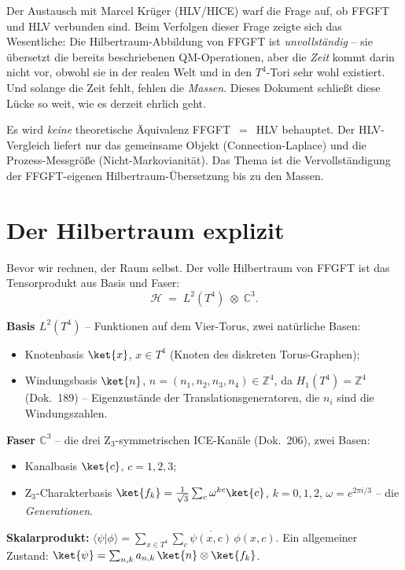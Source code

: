 Der Austausch mit Marcel Krüger (HLV/HICE) warf die Frage auf, ob FFGFT und HLV
verbunden sind. Beim Verfolgen dieser Frage zeigte sich das Wesentliche: Die
Hilbertraum-Abbildung von FFGFT ist \emph{unvollständig} -- sie übersetzt die
bereits beschriebenen QM-Operationen, aber die \emph{Zeit} kommt darin nicht
vor, obwohl sie in der realen Welt und in den $T^4$-Tori sehr wohl existiert.
Und solange die Zeit fehlt, fehlen die \emph{Massen}. Dieses Dokument schließt
diese Lücke so weit, wie es derzeit ehrlich geht.

\begin{important}[Geltungsregel]
Es wird \emph{keine} theoretische Äquivalenz FFGFT~$=$~HLV behauptet. Der
HLV-Vergleich liefert nur das gemeinsame Objekt (Connection-Laplace) und die
Prozess-Messgröße (Nicht-Markovianität). Das Thema ist die Vervollständigung
der FFGFT-eigenen Hilbertraum-Übersetzung bis zu den Massen.
\end{important}

\section{Der Hilbertraum explizit}

Bevor wir rechnen, der Raum selbst. Der volle Hilbertraum von FFGFT ist das
Tensorprodukt aus Basis und Faser:
\begin{equation}
  \mathcal{H}\;=\;L^2(T^4)\;\otimes\;\mathbb{C}^3 .
\end{equation}

\begin{notationBox}
\textbf{Basis $L^2(T^4)$} -- Funktionen auf dem Vier-Torus, zwei natürliche
Basen:
\begin{itemize}
  \item Knotenbasis $\ket{x}$, $x\in T^4$ (Knoten des diskreten Torus-Graphen);
  \item Windungsbasis $\ket{n}$, $n=(n_1,n_2,n_3,n_4)\in\mathbb{Z}^4$, da
        $H_1(T^4)=\mathbb{Z}^4$ (Dok.~189) -- Eigenzustände der
        Translationsgeneratoren, die $n_i$ sind die Windungszahlen.
\end{itemize}
\textbf{Faser $\mathbb{C}^3$} -- die drei Z$_3$-symmetrischen ICE-Kanäle
(Dok.~206), zwei Basen:
\begin{itemize}
  \item Kanalbasis $\ket{c}$, $c=1,2,3$;
  \item Z$_3$-Charakterbasis
        $\ket{f_k}=\tfrac{1}{\sqrt3}\sum_c\omega^{kc}\ket{c}$, $k=0,1,2$,
        $\omega=e^{2\pi i/3}$ -- die \emph{Generationen}.
\end{itemize}
\textbf{Skalarprodukt:} $\langle\psi|\phi\rangle=\sum_{x\in T^4}\sum_c
\overline{\psi(x,c)}\,\phi(x,c)$. Ein allgemeiner Zustand:
$\ket{\psi}=\sum_{n,k}a_{n,k}\,\ket{n}\otimes\ket{f_k}$.
\end{notationBox}


